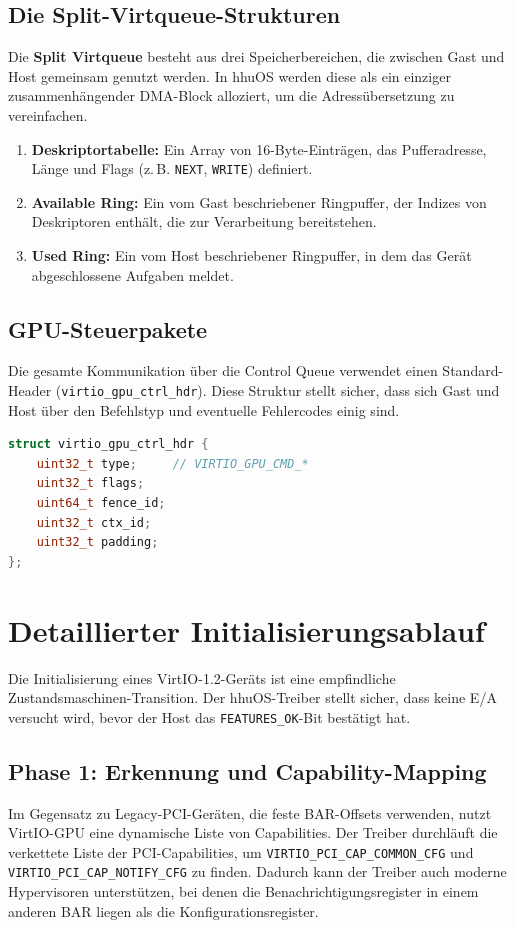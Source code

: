 \subsection{Die Split-Virtqueue-Strukturen}
Die \textbf{Split Virtqueue} besteht aus drei Speicherbereichen, die zwischen
Gast und Host gemeinsam genutzt werden. In hhuOS werden diese als ein einziger
zusammenhängender DMA-Block alloziert, um die Adressübersetzung zu
vereinfachen.

\begin{enumerate}
    \item \textbf{Deskriptortabelle:} Ein Array von 16-Byte-Einträgen, das Pufferadresse, Länge und Flags (z.\,B. \texttt{NEXT}, \texttt{WRITE}) definiert.
    \item \textbf{Available Ring:} Ein vom Gast beschriebener Ringpuffer, der Indizes von Deskriptoren enthält, die zur Verarbeitung bereitstehen.
    \item \textbf{Used Ring:} Ein vom Host beschriebener Ringpuffer, in dem das Gerät abgeschlossene Aufgaben meldet.
\end{enumerate}

\subsection{GPU-Steuerpakete}
Die gesamte Kommunikation über die Control Queue verwendet einen
Standard-Header (\texttt{virtio\_gpu\_ctrl\_hdr}). Diese Struktur stellt
sicher, dass sich Gast und Host über den Befehlstyp und eventuelle Fehlercodes
einig sind.

\begin{lstlisting}[language=C++, basicstyle=\small\ttfamily, frame=single]
struct virtio_gpu_ctrl_hdr {
    uint32_t type;     // VIRTIO_GPU_CMD_*
    uint32_t flags;
    uint64_t fence_id;
    uint32_t ctx_id;
    uint32_t padding;
};
\end{lstlisting}

\section{Detaillierter Initialisierungsablauf}
Die Initialisierung eines VirtIO-1.2-Geräts ist eine empfindliche
Zustandsmaschinen-Transition. Der hhuOS-Treiber stellt sicher, dass keine E/A
versucht wird, bevor der Host das \texttt{FEATURES\_OK}-Bit bestätigt hat.

\subsection{Phase 1: Erkennung und Capability-Mapping}
Im Gegensatz zu Legacy-PCI-Geräten, die feste BAR-Offsets verwenden, nutzt
VirtIO-GPU eine dynamische Liste von Capabilities. Der Treiber durchläuft die
verkettete Liste der PCI-Capabilities, um
\texttt{VIRTIO\_PCI\_CAP\_COMMON\_CFG} und
\texttt{VIRTIO\_PCI\_CAP\_NOTIFY\_CFG} zu finden. Dadurch kann der Treiber auch
moderne Hypervisoren unterstützen, bei denen die Benachrichtigungsregister in
einem anderen BAR liegen als die Konfigurationsregister.

